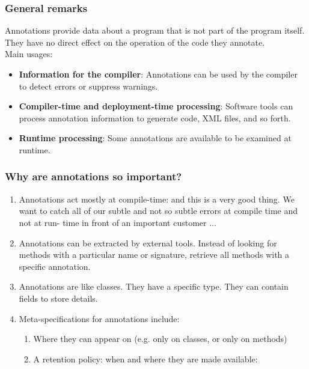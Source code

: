 \documentclass[10pt]{article}
\begin{document}
\subsubsection{General remarks}
Annotations provide data about a program that is not part of the program itself. They have no direct effect on the operation of the code they annotate. \\
Main usages:
\begin{itemize}
	\item \textbf{Information for the compiler}: Annotations can be used by the compiler to detect errors or suppress warnings.
	\item \textbf{Compiler-time and deployment-time processing}: Software tools can process annotation information to generate code, XML files, and so forth.
	\item \textbf{Runtime processing}: Some annotations are available to be examined at runtime.
\end{itemize}
\subsubsection{Why are annotations so important?}
\begin{enumerate}
	\item Annotations act mostly at compile-time: and this is a very good thing. We want to catch all of our subtle and not so subtle errors at compile time and not at run- time in front of an important customer ...
	\item Annotations can be extracted by external tools. Instead of looking for methods with a particular name or signature, retrieve all methods with a specific annotation.
	\item Annotations are like classes. They have a specific type. They can contain fields to store details.
	\item Meta-specifications for annotations include:
		\begin{enumerate}
			\item Where they can appear on (e.g. only on classes, or only on methods)
			\item A retention policy: when and where they are made available:
		\end{enumerate}
\end{enumerate}
\end{document}
